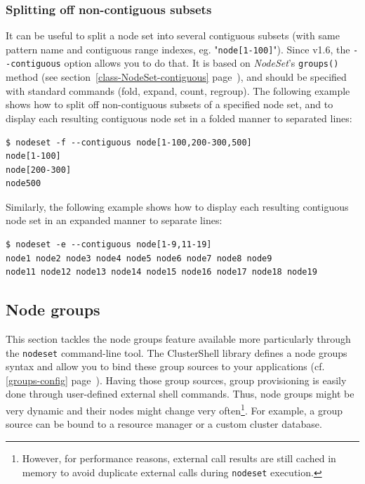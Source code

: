 \documentclass[english,a4paper]{csuserguide}
\newcommand{\NodeSet}{\textit{NodeSet}\xspace}
\newcommand{\nodeset}{\texttt{nodeset}\xspace}
\begin{document}
\subsubsection{Splitting off non-contiguous subsets}
\label{nodeset-splitting-contiguous}
It can be useful to split a node set into several contiguous subsets (with same pattern name and contiguous range indexes, eg. "\verb+node[1-100]+"). Since v1.6, the \verb+--contiguous+ option allows you to do that. It is based on \NodeSet's \lstinline+groups()+ method (see section~\ref{class-NodeSet-contiguous} page~\pageref{class-NodeSet-contiguous}), and should be specified with standard commands (fold, expand, count, regroup). The following example shows how to split   off non-contiguous subsets of a specified node set, and to display each resulting contiguous node set in a folded manner to separated lines:
\bigskip

\begin{lstlisting}[breaklines=true, breakatwhitespace=true]
$ nodeset -f --contiguous node[1-100,200-300,500]
node[1-100]
node[200-300]
node500
\end{lstlisting}

Similarly, the following example shows how to display each resulting contiguous node set in an expanded manner to separate lines:
\bigskip

\begin{lstlisting}[breaklines=true, breakatwhitespace=true]
$ nodeset -e --contiguous node[1-9,11-19]
node1 node2 node3 node4 node5 node6 node7 node8 node9
node11 node12 node13 node14 node15 node16 node17 node18 node19
\end{lstlisting}


\subsection{Node groups}
\label{nodeset-groups}

This section tackles the node groups feature available more particularly through the \nodeset command-line tool. The ClusterShell library defines a node groups syntax and allow you to bind these group sources to your applications (cf. \ref{groups-config} page~\pageref{groups-config}). Having those group sources, group provisioning is easily done through user-defined external shell commands. Thus, node groups might be very dynamic and their nodes might change very often\footnote{However, for performance reasons, external call results are still cached in memory to avoid duplicate external calls during \lstinline+nodeset+ execution.}. For example, a group source can be bound to a resource manager or a custom cluster database.
\end{document}
